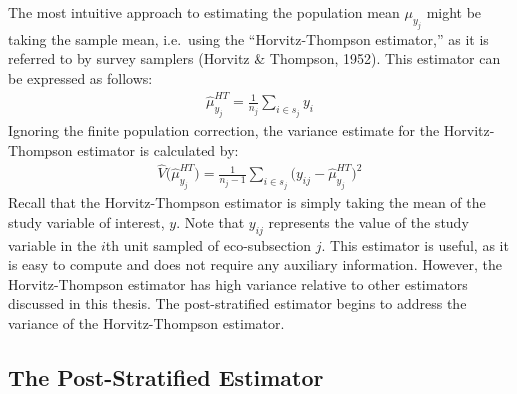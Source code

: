 \documentclass[12pt,twoside]{reedthesis}
\begin{document}
The most intuitive approach to estimating the population mean \(\mu_{y_j}\) might be taking the sample mean, i.e.~using the ``Horvitz-Thompson estimator,'' as it is referred to by survey samplers (Horvitz \& Thompson, 1952). This estimator can be expressed as follows:
\begin{align}
\hat\mu_{y_j}^{HT} = \frac{1}{n_j} \sum_{i \in s_j} y_i
\end{align}
Ignoring the finite population correction, the variance estimate for the Horvitz-Thompson estimator is calculated by:
\begin{align}
\hat V\Big(\hat\mu_{y_j}^{HT}\Big) = \frac{1}{n_j-1} \sum_{i \in s_j} \Big(y_{ij} - \hat\mu_{y_j}^{HT}\Big)^2
\end{align}
Recall that the Horvitz-Thompson estimator is simply taking the mean of the study variable of interest, \(y\). Note that \(y_{ij}\) represents the value of the study variable in the \(i\)th unit sampled of eco-subsection \(j\). This estimator is useful, as it is easy to compute and does not require any auxiliary information. However, the Horvitz-Thompson estimator has high variance relative to other estimators discussed in this thesis. The post-stratified estimator begins to address the variance of the Horvitz-Thompson estimator.

\hypertarget{the-post-stratified-estimator}{%
\subsection{The Post-Stratified Estimator}\label{the-post-stratified-estimator}}
\end{document}
